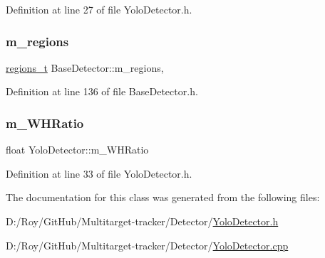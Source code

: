 Definition at line 27 of file Yolo\+Detector.\+h.

\mbox{\label{class_base_detector_a409c20093acba261db8354ca72058fce}} 
\subsubsection{\texorpdfstring{m\+\_\+regions}{m\_regions}}
{\footnotesize\ttfamily \mbox{\hyperlink{defines_8h_a01db0de56a20f4342820a093c5154536}{regions\+\_\+t}} Base\+Detector\+::m\+\_\+regions\hspace{0.3cm}{\ttfamily [protected]}, {\ttfamily [inherited]}}



Definition at line 136 of file Base\+Detector.\+h.

\mbox{\label{class_yolo_detector_ab6b6271101b6d3a78af10c8802ac88af}} 
\subsubsection{\texorpdfstring{m\+\_\+\+W\+H\+Ratio}{m\_WHRatio}}
{\footnotesize\ttfamily float Yolo\+Detector\+::m\+\_\+\+W\+H\+Ratio\hspace{0.3cm}{\ttfamily [private]}}



Definition at line 33 of file Yolo\+Detector.\+h.



The documentation for this class was generated from the following files\+:\begin{DoxyCompactItemize}
\item 
D\+:/\+Roy/\+Git\+Hub/\+Multitarget-\/tracker/\+Detector/\mbox{\hyperlink{_yolo_detector_8h}{Yolo\+Detector.\+h}}\item 
D\+:/\+Roy/\+Git\+Hub/\+Multitarget-\/tracker/\+Detector/\mbox{\hyperlink{_yolo_detector_8cpp}{Yolo\+Detector.\+cpp}}\end{DoxyCompactItemize}
